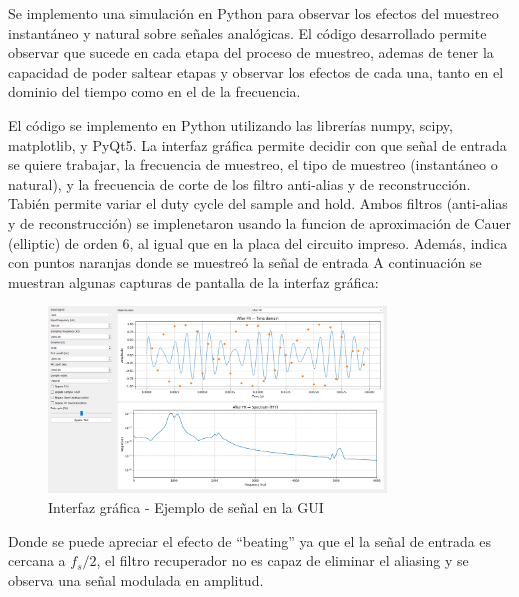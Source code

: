 Se implemento una simulación en Python para observar los efectos del muestreo
instantáneo y natural sobre señales analógicas. El código desarrollado permite
observar que sucede en cada etapa del proceso de muestreo, ademas de tener
la capacidad de poder saltear etapas y observar los efectos de cada una, tanto 
en el dominio del tiempo como en el de la frecuencia.

El código se implemento en Python utilizando las librerías numpy, scipy, matplotlib,
y PyQt5. La interfaz gráfica permite decidir con que señal de entrada se quiere
trabajar, la frecuencia de muestreo, el tipo de muestreo (instantáneo o natural),
y la frecuencia de corte de los filtro anti-alias y de reconstrucción.
Tabién permite variar el duty cycle del sample and hold.
Ambos filtros (anti-alias y de reconstrucción) se implenetaron
usando la funcion de aproximación de Cauer (elliptic) de orden 6,
al igual que en la placa del circuito impreso.
Además, indica con puntos naranjas donde se muestreó la señal de entrada
A continuación se muestran algunas capturas de pantalla de la interfaz gráfica:

\begin{figure}[H]
    \centering
    \includegraphics[width=0.8\textwidth]{Imagenes/gui_beating.png}
    \caption{Interfaz gráfica - Ejemplo de señal en la GUI}
    \label{fig:interfaz1}
\end{figure}

Donde se puede apreciar el efecto de ``beating'' ya que el la señal de entrada
es cercana a $f_s/2$, el filtro recuperador no es capaz de eliminar el aliasing
y se observa una señal modulada en amplitud.


